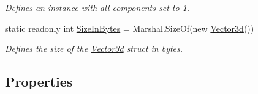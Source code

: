 \begin{DoxyCompactItemize}
\begin{DoxyCompactList}\small\item\em Defines an instance with all components set to 1. \end{DoxyCompactList}\item 
static readonly int \hyperlink{struct_open_t_k_1_1_vector3d_a5390299765c81e1b1f04850ee26c2a5e}{Size\-In\-Bytes} = Marshal.\-Size\-Of(new \hyperlink{struct_open_t_k_1_1_vector3d}{Vector3d}())
\begin{DoxyCompactList}\small\item\em Defines the size of the \hyperlink{struct_open_t_k_1_1_vector3d}{Vector3d} struct in bytes. \end{DoxyCompactList}\end{DoxyCompactItemize}
\subsection*{Properties}

